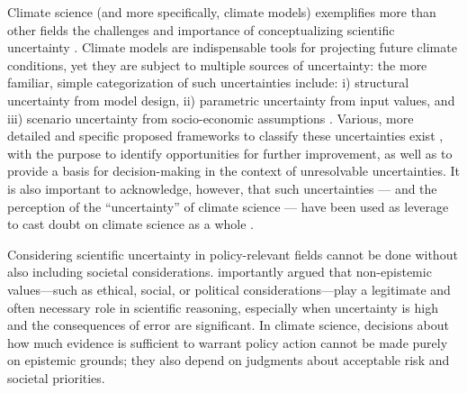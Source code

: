 \documentclass[draft]{agujournal2019}
\begin{document}
Climate science (and more specifically, climate models) exemplifies more than other fields the challenges and importance of conceptualizing scientific uncertainty \cite <see, for instance, the work of Elizabeth Lloyd, especially>[]{Lloyd_2010}. Climate models are indispensable tools for projecting future climate conditions, yet they are subject to multiple sources of uncertainty: the more familiar, simple categorization of such uncertainties include: i) structural uncertainty from model design, ii) parametric uncertainty from input values, and iii) scenario uncertainty from socio-economic assumptions \cite{Hawkins2009,Lehner2020}. Various, more detailed and specific proposed frameworks to classify these uncertainties exist \cite{Frigg2015,BEVAN2022102919}, with the purpose to identify opportunities for further improvement, as well as to provide a basis for decision-making in the context of unresolvable uncertainties. It is also important to acknowledge, however, that such uncertainties --- and the perception of the ``uncertainty'' of climate science --- have been used as leverage to cast doubt on climate science as a whole \cite{LEWANDOWSKY20151}.

Considering scientific uncertainty in policy-relevant fields cannot be done without also including societal considerations.  importantly argued that non-epistemic values---such as ethical, social, or political considerations---play a legitimate and often necessary role in scientific reasoning, especially when uncertainty is high and the consequences of error are significant. In climate science, decisions about how much evidence is sufficient to warrant policy action cannot be made purely on epistemic grounds; they also depend on judgments about acceptable risk and societal priorities.
\end{document}
